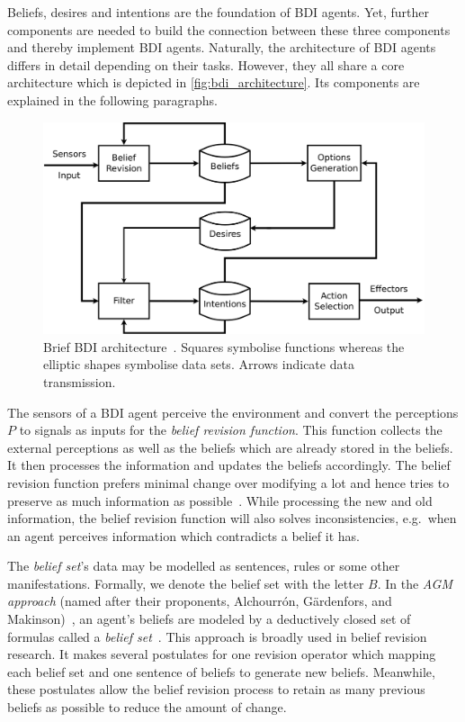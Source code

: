 Beliefs, desires and intentions are the foundation of BDI agents.
Yet, further components are needed to build the connection between these three components and thereby implement BDI agents.
Naturally, the architecture of BDI agents differs in detail depending on their tasks.
However, they all share a core architecture which is depicted in \autoref{fig:bdi_architecture}.
Its components are explained in the following paragraphs.
\begin{figure}[htbp]
  \centering
  \includegraphics[width=\textwidth]{images/BDIAr}
  \caption{Brief BDI architecture~\cite{BDIA}. Squares symbolise functions whereas the elliptic shapes symbolise data sets. Arrows indicate data transmission.}
  \label{fig:bdi_architecture}
\end{figure}

The sensors of a BDI agent perceive the environment and convert the perceptions $P$ to signals as inputs for the \emph{belief revision function}.
This function collects the external perceptions as well as the beliefs which are already stored in the beliefs.
It then processes the information and updates the beliefs accordingly.
The belief revision function prefers minimal change over modifying a lot and hence tries to preserve as much information as possible~\cite{Antje_SpatialBelief_2011}.
While processing the new and old information, the belief revision function will also solves inconsistencies, e.g.\ when an agent perceives information which contradicts a belief it has.

The \emph{belief set}'s data may be modelled as sentences, rules or some other manifestations.
Formally, we denote the belief set with the letter $B$.
In the \emph{AGM approach} (named after their proponents, Alchourrón, Gärdenfors, and Makinson)~\cite{alchourron_revision_1985}, an agent's beliefs are modeled by a deductively closed set of formulas called a \emph{belief set}~\cite{James_revise_2011}.
This approach is broadly used in belief revision research.
It makes several postulates for one revision operator which mapping each belief set and one sentence of beliefs to generate new beliefs.
Meanwhile, these postulates allow the belief revision process to retain as many previous beliefs as possible to reduce the amount of change.


